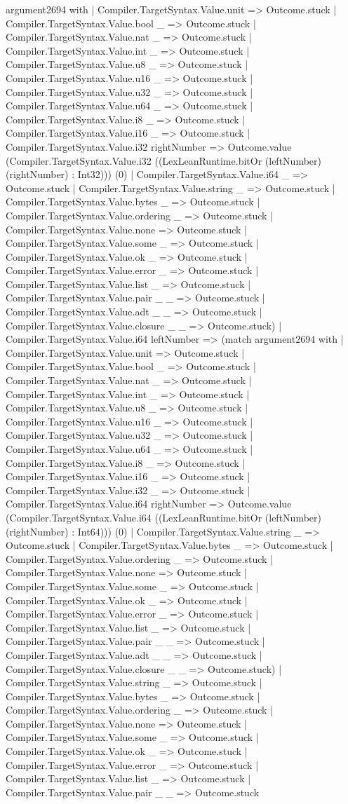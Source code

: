 \documentclass[11pt]{article}
\begin{document}
argument2694 with | Compiler.TargetSyntax.Value.unit => Outcome.stuck | Compiler.TargetSyntax.Value.bool \_ => Outcome.stuck | Compiler.TargetSyntax.Value.nat \_ => Outcome.stuck | Compiler.TargetSyntax.Value.int \_ => Outcome.stuck | Compiler.TargetSyntax.Value.u8 \_ => Outcome.stuck | Compiler.TargetSyntax.Value.u16 \_ => Outcome.stuck | Compiler.TargetSyntax.Value.u32 \_ => Outcome.stuck | Compiler.TargetSyntax.Value.u64 \_ => Outcome.stuck | Compiler.TargetSyntax.Value.i8 \_ => Outcome.stuck | Compiler.TargetSyntax.Value.i16 \_ => Outcome.stuck | Compiler.TargetSyntax.Value.i32 rightNumber => Outcome.value (Compiler.TargetSyntax.Value.i32 ((LexLeanRuntime.bitOr (leftNumber) (rightNumber) : Int32))) (0) | Compiler.TargetSyntax.Value.i64 \_ => Outcome.stuck | Compiler.TargetSyntax.Value.string \_ => Outcome.stuck | Compiler.TargetSyntax.Value.bytes \_ => Outcome.stuck | Compiler.TargetSyntax.Value.ordering \_ => Outcome.stuck | Compiler.TargetSyntax.Value.none => Outcome.stuck | Compiler.TargetSyntax.Value.some \_ => Outcome.stuck | Compiler.TargetSyntax.Value.ok \_ => Outcome.stuck | Compiler.TargetSyntax.Value.error \_ => Outcome.stuck | Compiler.TargetSyntax.Value.list \_ => Outcome.stuck | Compiler.TargetSyntax.Value.pair \_ \_ => Outcome.stuck | Compiler.TargetSyntax.Value.adt \_ \_ => Outcome.stuck | Compiler.TargetSyntax.Value.closure \_ \_ => Outcome.stuck) | Compiler.TargetSyntax.Value.i64 leftNumber => (match argument2694 with | Compiler.TargetSyntax.Value.unit => Outcome.stuck | Compiler.TargetSyntax.Value.bool \_ => Outcome.stuck | Compiler.TargetSyntax.Value.nat \_ => Outcome.stuck | Compiler.TargetSyntax.Value.int \_ => Outcome.stuck | Compiler.TargetSyntax.Value.u8 \_ => Outcome.stuck | Compiler.TargetSyntax.Value.u16 \_ => Outcome.stuck | Compiler.TargetSyntax.Value.u32 \_ => Outcome.stuck | Compiler.TargetSyntax.Value.u64 \_ => Outcome.stuck | Compiler.TargetSyntax.Value.i8 \_ => Outcome.stuck | Compiler.TargetSyntax.Value.i16 \_ => Outcome.stuck | Compiler.TargetSyntax.Value.i32 \_ => Outcome.stuck | Compiler.TargetSyntax.Value.i64 rightNumber => Outcome.value (Compiler.TargetSyntax.Value.i64 ((LexLeanRuntime.bitOr (leftNumber) (rightNumber) : Int64))) (0) | Compiler.TargetSyntax.Value.string \_ => Outcome.stuck | Compiler.TargetSyntax.Value.bytes \_ => Outcome.stuck | Compiler.TargetSyntax.Value.ordering \_ => Outcome.stuck | Compiler.TargetSyntax.Value.none => Outcome.stuck | Compiler.TargetSyntax.Value.some \_ => Outcome.stuck | Compiler.TargetSyntax.Value.ok \_ => Outcome.stuck | Compiler.TargetSyntax.Value.error \_ => Outcome.stuck | Compiler.TargetSyntax.Value.list \_ => Outcome.stuck | Compiler.TargetSyntax.Value.pair \_ \_ => Outcome.stuck | Compiler.TargetSyntax.Value.adt \_ \_ => Outcome.stuck | Compiler.TargetSyntax.Value.closure \_ \_ => Outcome.stuck) | Compiler.TargetSyntax.Value.string \_ => Outcome.stuck | Compiler.TargetSyntax.Value.bytes \_ => Outcome.stuck | Compiler.TargetSyntax.Value.ordering \_ => Outcome.stuck | Compiler.TargetSyntax.Value.none => Outcome.stuck | Compiler.TargetSyntax.Value.some \_ => Outcome.stuck | Compiler.TargetSyntax.Value.ok \_ => Outcome.stuck | Compiler.TargetSyntax.Value.error \_ => Outcome.stuck | Compiler.TargetSyntax.Value.list \_ => Outcome.stuck | Compiler.TargetSyntax.Value.pair \_ \_ => Outcome.stuck 
\end{document}
